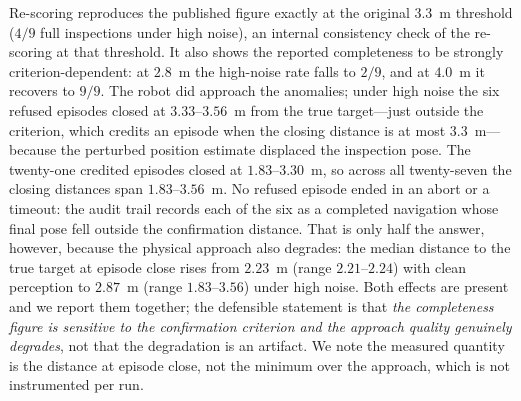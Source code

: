 Re-scoring reproduces the published figure exactly at the original $3.3$~m threshold
($4/9$ full inspections under high noise), an internal consistency check of the
re-scoring at that threshold. It also shows the reported
completeness to be strongly criterion-dependent: at $2.8$~m the high-noise rate falls
to $2/9$, and at $4.0$~m it recovers to $9/9$. The robot did approach the anomalies;
under high noise the six refused episodes closed at $3.33$--$3.56$~m from the true
target---just outside the criterion, which credits an episode when the closing
distance is at most $3.3$~m---because the perturbed position estimate displaced the
inspection pose. The twenty-one credited episodes closed at $1.83$--$3.30$~m, so
across all twenty-seven the closing distances span $1.83$--$3.56$~m. No refused
episode ended in an abort or a timeout: the audit trail records each of the six as a
completed navigation whose final pose fell outside the confirmation distance. That is only half the answer, however, because the physical approach also
degrades: the median distance to the true target at episode close rises from
$2.23$~m (range $2.21$--$2.24$) with clean perception to $2.87$~m (range
$1.83$--$3.56$) under high noise. Both effects are present and we report them
together; the defensible statement is that \emph{the completeness figure is sensitive
to the confirmation criterion and the approach quality genuinely degrades}, not that
the degradation is an artifact. We note the measured quantity is the distance at
episode close, not the minimum over the approach, which is not instrumented per run.

